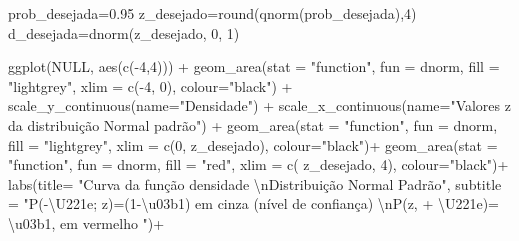 \documentclass[
]{book}
\newenvironment{Shaded}{\begin{snugshade}}{\end{snugshade}}
\newcommand{\AttributeTok}[1]{\textcolor[rgb]{0.77,0.63,0.00}{#1}}
\newcommand{\ConstantTok}[1]{\textcolor[rgb]{0.00,0.00,0.00}{#1}}
\newcommand{\DecValTok}[1]{\textcolor[rgb]{0.00,0.00,0.81}{#1}}
\newcommand{\FloatTok}[1]{\textcolor[rgb]{0.00,0.00,0.81}{#1}}
\newcommand{\FunctionTok}[1]{\textcolor[rgb]{0.00,0.00,0.00}{#1}}
\newcommand{\NormalTok}[1]{#1}
\newcommand{\OtherTok}[1]{\textcolor[rgb]{0.56,0.35,0.01}{#1}}
\newcommand{\SpecialCharTok}[1]{\textcolor[rgb]{0.00,0.00,0.00}{#1}}
\newcommand{\StringTok}[1]{\textcolor[rgb]{0.31,0.60,0.02}{#1}}
\begin{document}
\hfill\break

\begin{Shaded}
\begin{Highlighting}[]
\NormalTok{prob\_desejada}\OtherTok{=}\FloatTok{0.95}
\NormalTok{z\_desejado}\OtherTok{=}\FunctionTok{round}\NormalTok{(}\FunctionTok{qnorm}\NormalTok{(prob\_desejada),}\DecValTok{4}\NormalTok{)}
\NormalTok{d\_desejada}\OtherTok{=}\FunctionTok{dnorm}\NormalTok{(z\_desejado, }\DecValTok{0}\NormalTok{, }\DecValTok{1}\NormalTok{)}

\FunctionTok{ggplot}\NormalTok{(}\ConstantTok{NULL}\NormalTok{, }\FunctionTok{aes}\NormalTok{(}\FunctionTok{c}\NormalTok{(}\SpecialCharTok{{-}}\DecValTok{4}\NormalTok{,}\DecValTok{4}\NormalTok{))) }\SpecialCharTok{+}
  \FunctionTok{geom\_area}\NormalTok{(}\AttributeTok{stat =} \StringTok{"function"}\NormalTok{, }
            \AttributeTok{fun =}\NormalTok{ dnorm, }
            \AttributeTok{fill =} \StringTok{"lightgrey"}\NormalTok{, }
            \AttributeTok{xlim =} \FunctionTok{c}\NormalTok{(}\SpecialCharTok{{-}}\DecValTok{4}\NormalTok{, }\DecValTok{0}\NormalTok{),}
            \AttributeTok{colour=}\StringTok{"black"}\NormalTok{) }\SpecialCharTok{+}
  \FunctionTok{scale\_y\_continuous}\NormalTok{(}\AttributeTok{name=}\StringTok{"Densidade"}\NormalTok{) }\SpecialCharTok{+}
  \FunctionTok{scale\_x\_continuous}\NormalTok{(}\AttributeTok{name=}\StringTok{"Valores \textasciigrave{}\textasciigrave{}z\textquotesingle{}\textquotesingle{} da distribuição Normal padrão"}\NormalTok{)  }\SpecialCharTok{+}
  \FunctionTok{geom\_area}\NormalTok{(}\AttributeTok{stat =} \StringTok{"function"}\NormalTok{,}
            \AttributeTok{fun =}\NormalTok{ dnorm, }
            \AttributeTok{fill =} \StringTok{"lightgrey"}\NormalTok{, }
            \AttributeTok{xlim =} \FunctionTok{c}\NormalTok{(}\DecValTok{0}\NormalTok{, z\_desejado),}
            \AttributeTok{colour=}\StringTok{"black"}\NormalTok{)}\SpecialCharTok{+}
  \FunctionTok{geom\_area}\NormalTok{(}\AttributeTok{stat =} \StringTok{"function"}\NormalTok{,}
            \AttributeTok{fun =}\NormalTok{ dnorm, }
            \AttributeTok{fill =} \StringTok{"red"}\NormalTok{, }
            \AttributeTok{xlim =} \FunctionTok{c}\NormalTok{( z\_desejado, }\DecValTok{4}\NormalTok{),}
            \AttributeTok{colour=}\StringTok{"black"}\NormalTok{)}\SpecialCharTok{+}
  \FunctionTok{labs}\NormalTok{(}\AttributeTok{title=} 
      \StringTok{"Curva da função densidade}
\StringTok{      }\SpecialCharTok{\textbackslash{}n}\StringTok{Distribuição Normal Padrão"}\NormalTok{, }
      \AttributeTok{subtitle =} \StringTok{"P({-}\textbackslash{}U221e; z)=(1{-}\textbackslash{}u03b1) em cinza (nível de confiança)  }\SpecialCharTok{\textbackslash{}n}\StringTok{P(z, + \textbackslash{}U221e)= \textbackslash{}u03b1, em vermelho "}\NormalTok{)}\SpecialCharTok{+}

\end{Highlighting}
\end{Shaded}
\end{document}
